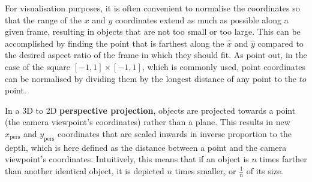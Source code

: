
For visualisation purposes, it is often convenient to normalise the coordinates so that the range of the $x$ and $y$ coordinates extend as much as possible along a given frame, resulting in objects that are not too small or too large.
This can be accomplished by finding the point that is farthest along the $\hat{x}$ and $\hat{y}$ compared to the desired aspect ratio of the frame in which they should fit.
As \citet{Foley92} point out, in the case of the square $[-1, 1] \times [-1, 1]$, which is commonly used, point coordinates can be normalised by dividing them by the longest distance of any point to the $to$ point.

In a 3D to 2D \textbf{perspective projection}, objects are projected towards a point (the camera viewpoint's coordinates) rather than a plane.
This results in new $x_\mathrm{pers}$ and $y_\mathrm{pers}$ coordinates that are scaled inwards in inverse proportion to the depth, which is here defined as the distance between a point and the camera viewpoint's coordinates.
Intuitively, this means that if an object is $n$ times farther than another identical object, it is depicted $n$ times smaller, or $\frac{1}{n}$ of its size.


